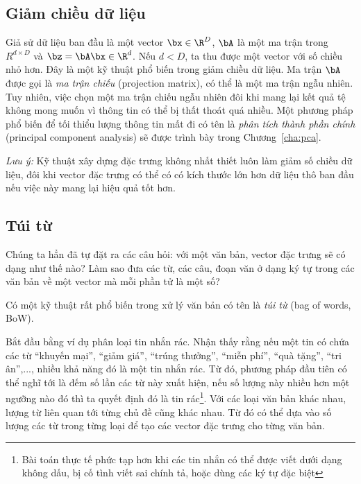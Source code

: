 \subsection{Giảm chiều dữ liệu}
Giả sử dữ liệu ban đầu là một vector $\bx \in \R^D$, $\bA$ là một ma trận trong
$R^{d\times D}$ và $\bz = \bA\bx\in\R^d$. Nếu $d < D$, ta thu được một vector
với số chiều nhỏ hơn. Đây là một kỹ thuật phổ biến trong giảm chiều dữ liệu. Ma
trận $\bA$ được gọi là \textit{ma trận chiếu} (projection matrix), có thể là một ma trận ngẫu nhiên.
Tuy nhiên, việc chọn một ma trận chiếu ngẫu nhiên đôi khi mang lại kết quả tệ
không mong muốn vì thông tin có thể bị thất thoát quá nhiều. Một phương pháp phổ
biến để tối thiểu lượng thông tin mất đi có tên là \textit{phân tích thành phần
chính} ({principal component analysis}) sẽ được trình bày trong
Chương~\ref{cha:pca}.

\textit{Lưu ý:} {Kỹ thuật xây dựng đặc trưng không nhất thiết luôn làm giảm số
chiều dữ liệu, đôi khi vector đặc trưng có thể có có kích thước lớn hơn dữ liệu
thô ban đầu nếu việc này mang lại hiệu quả tốt hơn.}

 
 
\subsection{Túi từ}

Chúng ta hẳn đã tự đặt ra các câu hỏi: với một văn bản, vector đặc trưng sẽ có
dạng như thế nào? Làm sao đưa các từ, các câu, đoạn văn ở dạng ký tự
trong các văn bản về một vector mà mỗi phần tử là một số?
 
Có một kỹ thuật rất phổ biến trong xử lý văn bản có tên là \textit{túi từ}
({bag of words, BoW}).
 
Bắt đầu bằng ví dụ phân loại tin nhắn rác. Nhận thấy rằng nếu một tin có chứa
các từ {``khuyến mại'', ``giảm giá'', ``trúng thưởng'', ``miễn phí'', ``quà tặng'', ``tri
ân'',...}, nhiều khả năng đó là một tin nhắn rác. Từ đó, phương pháp đầu tiên có
thể nghĩ tới là {đếm} số lần các từ này xuất hiện, nếu số lượng này nhiều hơn
một ngưỡng nào đó thì ta quyết định đó là tin rác\footnote{Bài toán thực tế phức
tạp hơn khi các tin nhắn có thể được viết dưới dạng không dấu, bị cố tình viết
sai chính tả, hoặc dùng các ký tự đặc biệt}. Với các loại văn bản khác nhau,
lượng từ liên quan tới từng chủ đề cũng khác nhau. Từ đó có thể dựa vào số lượng
các từ trong từng loại để tạo các vector đặc trưng cho từng văn bản.
 
